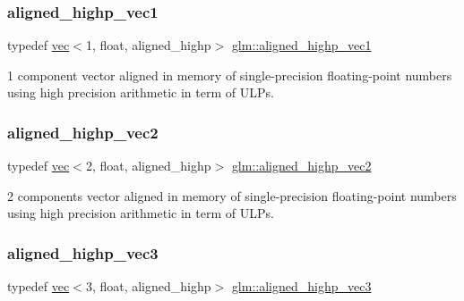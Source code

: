 \subsubsection{\texorpdfstring{aligned\+\_\+highp\+\_\+vec1}{aligned\_highp\_vec1}}
{\footnotesize\ttfamily typedef \mbox{\hyperlink{structglm_1_1vec}{vec}}$<$1, float, aligned\+\_\+highp$>$ \mbox{\hyperlink{group__gtc__type__aligned_ga8da7535c1fe488b2b9a29c0c05e7b17e}{glm\+::aligned\+\_\+highp\+\_\+vec1}}}



1 component vector aligned in memory of single-\/precision floating-\/point numbers using high precision arithmetic in term of U\+L\+Ps. 

\mbox{\label{group__gtc__type__aligned_ga7467c1a16f31911de3b927338434af6d}} 
\subsubsection{\texorpdfstring{aligned\+\_\+highp\+\_\+vec2}{aligned\_highp\_vec2}}
{\footnotesize\ttfamily typedef \mbox{\hyperlink{structglm_1_1vec}{vec}}$<$2, float, aligned\+\_\+highp$>$ \mbox{\hyperlink{group__gtc__type__aligned_ga7467c1a16f31911de3b927338434af6d}{glm\+::aligned\+\_\+highp\+\_\+vec2}}}



2 components vector aligned in memory of single-\/precision floating-\/point numbers using high precision arithmetic in term of U\+L\+Ps. 

\mbox{\label{group__gtc__type__aligned_ga9ddb18aa4936b5aa354fcefe179675af}} 
\subsubsection{\texorpdfstring{aligned\+\_\+highp\+\_\+vec3}{aligned\_highp\_vec3}}
{\footnotesize\ttfamily typedef \mbox{\hyperlink{structglm_1_1vec}{vec}}$<$3, float, aligned\+\_\+highp$>$ \mbox{\hyperlink{group__gtc__type__aligned_ga9ddb18aa4936b5aa354fcefe179675af}{glm\+::aligned\+\_\+highp\+\_\+vec3}}}



